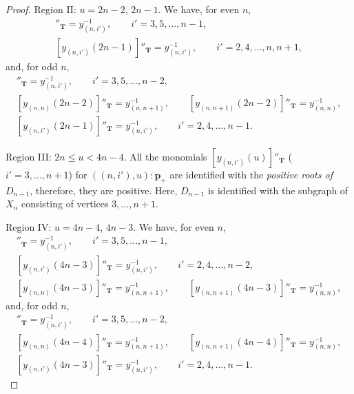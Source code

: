 \documentclass[11pt]{article}
\numberwithin{equation}{section}
\theoremstyle{definition}
\begin{document}
\begin{proof}
Region II: $u=2n-2$, $2n-1$.
We have, for even $n$,
\begin{gather*}
[y_{(n,i')}(2n-2)]''_{\mathbf{T}} =y_{(n,i')}^{-1},\qquad  i'=3,5,\dots,n-1 ,\nonumber\\
[y_{(n,i')}(2n-1)]''_{\mathbf{T}} =y_{(n,i')}^{-1},\qquad  i'=2,4,\dots,n,n+1 ,%
\end{gather*}
and, for odd $n$,
\begin{gather*}
[y_{(n,i')}(2n-2)]''_{\mathbf{T}} =y_{(n,i')}^{-1}, \qquad  i'=3,5,\dots,n-2 ,\nonumber\\
[y_{(n,n)}(2n-2)]''_{\mathbf{T}} =y_{(n,n+1)}^{-1},
\qquad [y_{(n,n+1)}(2n-2)]''_{\mathbf{T}}=y_{(n,n)}^{-1},\nonumber\\
[y_{(n,i')}(2n-1)]''_{\mathbf{T}} =y_{(n,i')}^{-1},\qquad i'=2,4,\dots,n-1.%
\end{gather*}

Region III: $2n \leq u < 4n-4$.
All the  monomials
$[y_{(n,i')} (u)]''_{\mathbf{T}}$ ($i'=3,\dots,n+1$)
 for $((n,i'),u):\mathbf{p}_+$
are  identif\/ied with
the {\em positive roots of $D_{n-1}$},
therefore, they are positive.
Here, $D_{n-1}$ is identif\/ied with the subgraph of $X_n$
consisting of vertices $3, \dots, n+1$.

Region IV: $u=4n-4$, $4n-3$. We have, for even $n$,
\begin{gather}
[y_{(n,i')}(4n-4)]''_{\mathbf{T}} =y_{(n,i')}^{-1}, \qquad i'=3,5,\dots,n-1,\nonumber\\
[y_{(n,i')}(4n-3)]''_{\mathbf{T}} =y_{(n,i')}^{-1}, \qquad i'=2,4,\dots,n-2,\nonumber\\
[y_{(n,n)}(4n-3)]''_{\mathbf{T}} =y_{(n,n+1)}^{-1},
\qquad [y_{(n,n+1)}(4n-3)]''_{\mathbf{T}}=y_{(n,n)}^{-1},\label{eq:yt3}
\end{gather}
and, for odd $n$,
\begin{gather}
[y_{(n,i')}(4n-4)]''_{\mathbf{T}} =y_{(n,i')}^{-1}, \qquad  i'=3,5,\dots,n-2 ,\nonumber\\
[y_{(n,n)}(4n-4)]''_{\mathbf{T}} =y_{(n,n+1)}^{-1},
\qquad [y_{(n,n+1)}(4n-4)]''_{\mathbf{T}}=y_{(n,n)}^{-1},\nonumber\\
[y_{(n,i')}(4n-3)]''_{\mathbf{T}} =y_{(n,i')}^{-1},\qquad i'=2,4,\dots,n-1.\label{eq:yt6}
\end{gather}


\end{proof}
\end{document}

